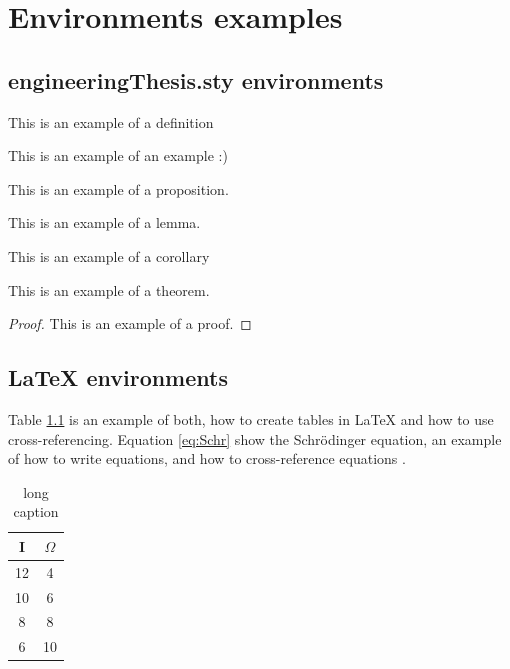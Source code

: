 \chapter{Environments examples}
\label{ch:environments}

\section{engineeringThesis.sty environments}

\begin{definition}
This is an example of a definition
\end{definition}

\begin{example}
This is an example of an example :)
\end{example}

\begin{proposition}
This is an example of a proposition.
\end{proposition}

\begin{lemma}
This is an example of a lemma.
\end{lemma}

\begin{corollary}
This is an example of a corollary
\end{corollary}

\begin{theorem}
This is an example of a theorem.
\end{theorem}

\begin{proof}
This is an example of a proof.
\end{proof}

\section{\LaTeX{} environments}

Table \ref{tab:ResistanceTable} is an example of both, how to create tables in \LaTeX{} and how to use cross-referencing. Equation \ref{eq:Schr} show the Schr\"{o}dinger equation, an example of how to write equations, and how to cross-reference equations \cite{Quantum}.

\begin{table}[h!]
	\centering
	\begin{tabular}{c | c}
		I & $\Omega$ \\ \hline
		12 & 4 \\
		10 & 6 \\
		8 & 8 \\
		6 & 10 \\
	\end{tabular}
	\caption[short caption]{long caption}%
	\label{tab:ResistanceTable}
\end{table}

